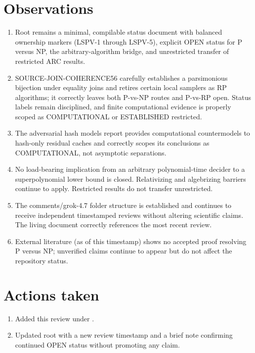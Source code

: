 \documentclass[11pt]{article}
\begin{document}
\section{Observations}
\begin{enumerate}
\item Root  remains a minimal, compilable status document with balanced ownership markers (LSPV-1 through LSPV-5), explicit OPEN status for P versus NP, the arbitrary-algorithm bridge, and unrestricted transfer of restricted ARC results.
\item SOURCE-JOIN-COHERENCE56 carefully establishes a parsimonious bijection under equality joins and retires certain local samplers as RP algorithms; it correctly leaves both P-vs-NP routes and P-vs-RP open. Status labels remain disciplined, and finite computational evidence is properly scoped as COMPUTATIONAL or ESTABLISHED restricted.
\item The adversarial hash models report provides computational countermodels to hash-only residual caches and correctly scopes its conclusions as COMPUTATIONAL, not asymptotic separations.
\item No load-bearing implication from an arbitrary polynomial-time decider to a superpolynomial lower bound is closed. Relativizing and algebrizing barriers continue to apply. Restricted results do not transfer unrestricted.
\item The comments/grok-4.7 folder structure is established and continues to receive independent timestamped reviews without altering scientific claims. The living document correctly references the most recent review.
\item External literature (as of this timestamp) shows no accepted proof resolving P versus NP; unverified claims continue to appear but do not affect the repository status.
\end{enumerate}

\section{Actions taken}
\begin{enumerate}
\item Added this review under .
\item Updated root  with a new review timestamp and a brief note confirming continued OPEN status without promoting any claim.
\end{enumerate}
\end{document}
